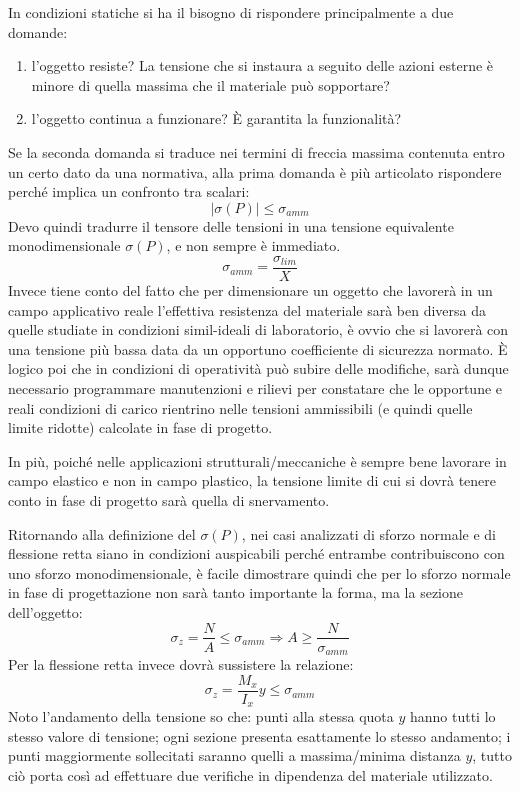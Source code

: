 \documentclass{article}
\begin{document}
\begin{adjustwidth}{2in}{}
		In condizioni statiche si ha il bisogno di rispondere principalmente a due domande: 
		\begin{enumerate}
			\item l'oggetto resiste? La tensione che si instaura a seguito delle azioni esterne è minore di quella massima che il materiale può sopportare?
			\item l'oggetto continua a funzionare? È garantita la funzionalità?
		\end{enumerate}
		Se la seconda domanda si traduce nei termini di freccia massima contenuta entro un certo dato da una normativa, alla prima domanda è più articolato rispondere perché implica un confronto tra scalari:
		\[ |\sigma(P)|\leq \sigma_{amm}\]
		Devo quindi tradurre il tensore delle tensioni in una tensione equivalente monodimensionale $\sigma(P)$, e non sempre è immediato. 
		\[\sigma_{amm} = \dfrac{\sigma_{lim}}{X}\]
		Invece tiene conto del fatto che per dimensionare un oggetto che lavorerà in un campo applicativo reale l'effettiva resistenza del materiale sarà ben diversa da quelle studiate in condizioni simil-ideali di laboratorio, è ovvio che si lavorerà con una tensione più bassa data da un opportuno coefficiente di sicurezza normato. È logico poi che in condizioni di operatività può subire delle modifiche, sarà dunque necessario programmare manutenzioni e rilievi per constatare che le opportune e reali condizioni di carico rientrino nelle tensioni ammissibili (e quindi quelle limite ridotte) calcolate in fase di progetto. \newline 
		
		In più, poiché nelle applicazioni strutturali/meccaniche è sempre bene lavorare in campo elastico e non in campo plastico, la tensione limite di cui si dovrà tenere conto in fase di progetto sarà quella di snervamento. \newline 
		
		Ritornando alla definizione del $ \sigma(P) $, nei casi analizzati di sforzo normale e di flessione retta siano in condizioni auspicabili perché entrambe contribuiscono con uno sforzo monodimensionale, è facile dimostrare quindi che per lo sforzo normale in fase di progettazione non sarà tanto importante la forma, ma la sezione dell'oggetto: 
		\[ \sigma_z = \dfrac{N}{A} \leq \sigma_{amm} \Rightarrow A \geq \dfrac{N}{\sigma_{amm}}\]
		Per la flessione retta invece dovrà sussistere la relazione: 
		\[ \sigma_z = \dfrac{M_x}{I_x}y \leq \sigma_{amm} \]
		Noto l'andamento della tensione so che: punti alla stessa quota $y$ hanno tutti lo stesso valore di tensione; ogni sezione presenta esattamente lo stesso andamento; i punti maggiormente sollecitati saranno quelli a massima/minima distanza $y$, tutto ciò porta così ad effettuare due verifiche in dipendenza del materiale utilizzato. 
		

\end{adjustwidth}
\end{document}
